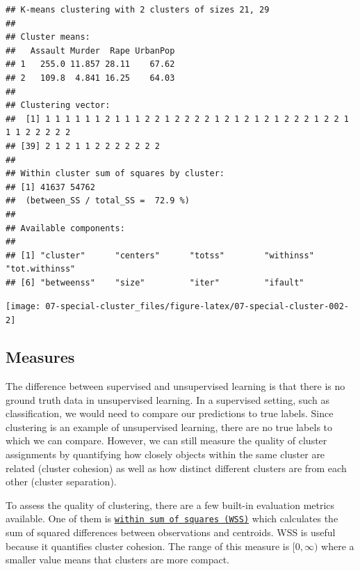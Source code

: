 \documentclass[
]{scrbook}
\newenvironment{Shaded}{\begin{snugshade}}{\end{snugshade}}
\newcommand{\CommentTok}[1]{\textcolor[rgb]{0.56,0.35,0.01}{\textit{#1}}}
\newcommand{\FunctionTok}[1]{\textcolor[rgb]{0.00,0.00,0.00}{#1}}
\newcommand{\NormalTok}[1]{#1}
\newcommand{\OtherTok}[1]{\textcolor[rgb]{0.56,0.35,0.01}{#1}}
\newcommand{\SpecialCharTok}[1]{\textcolor[rgb]{0.00,0.00,0.00}{#1}}
\renewenvironment{Shaded} {\begin{snugshade}\small} {\end{snugshade}}
\begin{document}
\begin{verbatim}
## K-means clustering with 2 clusters of sizes 21, 29
## 
## Cluster means:
##   Assault Murder  Rape UrbanPop
## 1   255.0 11.857 28.11    67.62
## 2   109.8  4.841 16.25    64.03
## 
## Clustering vector:
##  [1] 1 1 1 1 1 1 2 1 1 1 2 2 1 2 2 2 2 1 2 1 2 1 2 1 2 2 2 1 2 2 1 1 1 2 2 2 2 2
## [39] 2 1 2 1 1 2 2 2 2 2 2 2
## 
## Within cluster sum of squares by cluster:
## [1] 41637 54762
##  (between_SS / total_SS =  72.9 %)
## 
## Available components:
## 
## [1] "cluster"      "centers"      "totss"        "withinss"     "tot.withinss"
## [6] "betweenss"    "size"         "iter"         "ifault"
\end{verbatim}

\begin{Shaded}
\end{Shaded}

\begin{center}\texttt{[image: 07-special-cluster\_files/figure-latex/07-special-cluster-002-2]} \end{center}

\hypertarget{measures}{%
\subsection{Measures}\label{measures}}

The difference between supervised and unsupervised learning is that there is no ground truth data in unsupervised learning.
In a supervised setting, such as classification, we would need to compare our predictions to true labels.
Since clustering is an example of unsupervised learning, there are no true labels to which we can compare.
However, we can still measure the quality of cluster assignments by quantifying how closely objects within the same cluster are related (cluster cohesion) as well as how distinct different clusters are from each other (cluster separation).

To assess the quality of clustering, there are a few built-in evaluation metrics available.
One of them is \href{https://mlr3cluster.mlr-org.com/reference/mlr_measures_clust.wss.html}{\texttt{within\ sum\ of\ squares\ (WSS)}} which calculates the sum of squared differences between observations and centroids.
WSS is useful because it quantifies cluster cohesion.
The range of this measure is \([0, \infty)\) where a smaller value means that clusters are more compact.
\end{document}
